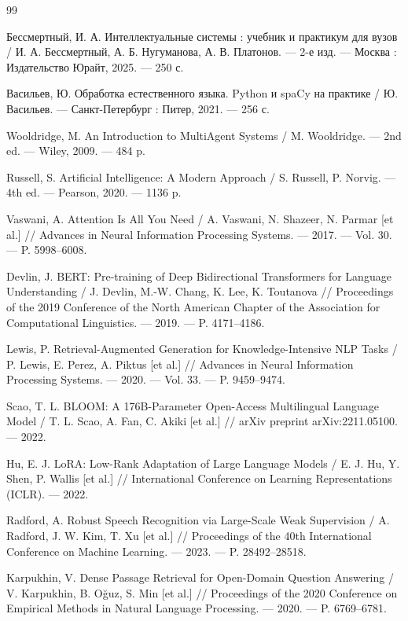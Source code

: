 \documentclass[a4paper,14pt]{extarticle}
\begin{document}
	\begin{thebibliography}{99}
		\fontsize{13pt}{15pt}\selectfont
		
		 Бессмертный, И. А. Интеллектуальные системы : учебник и практикум для вузов / И. А. Бессмертный, А. Б. Нугуманова, А. В. Платонов. — 2-е изд. — Москва : Издательство Юрайт, 2025. — 250 с.
		
		 Васильев, Ю. Обработка естественного языка. Python и spaCy на практике / Ю. Васильев. — Санкт-Петербург : Питер, 2021. — 256 с.
		
		 Wooldridge, M. An Introduction to MultiAgent Systems / M. Wooldridge. — 2nd ed. — Wiley, 2009. — 484 p.
		
		 Russell, S. Artificial Intelligence: A Modern Approach / S. Russell, P. Norvig. — 4th ed. — Pearson, 2020. — 1136 p.
		
		 Vaswani, A. Attention Is All You Need / A. Vaswani, N. Shazeer, N. Parmar [et al.] // Advances in Neural Information Processing Systems. — 2017. — Vol. 30. — P. 5998–6008.
		
		 Devlin, J. BERT: Pre-training of Deep Bidirectional Transformers for Language Understanding / J. Devlin, M.-W. Chang, K. Lee, K. Toutanova // Proceedings of the 2019 Conference of the North American Chapter of the Association for Computational Linguistics. — 2019. — P. 4171–4186.
		
		 Lewis, P. Retrieval-Augmented Generation for Knowledge-Intensive NLP Tasks / P. Lewis, E. Perez, A. Piktus [et al.] // Advances in Neural Information Processing Systems. — 2020. — Vol. 33. — P. 9459–9474.
		
		 Scao, T. L. BLOOM: A 176B-Parameter Open-Access Multilingual Language Model / T. L. Scao, A. Fan, C. Akiki [et al.] // arXiv preprint arXiv:2211.05100. — 2022.
		
		 Hu, E. J. LoRA: Low-Rank Adaptation of Large Language Models / E. J. Hu, Y. Shen, P. Wallis [et al.] // International Conference on Learning Representations (ICLR). — 2022.
		
		 Radford, A. Robust Speech Recognition via Large-Scale Weak Supervision / A. Radford, J. W. Kim, T. Xu [et al.] // Proceedings of the 40th International Conference on Machine Learning. — 2023. — P. 28492–28518.
		
		 Karpukhin, V. Dense Passage Retrieval for Open-Domain Question Answering / V. Karpukhin, B. Oğuz, S. Min [et al.] // Proceedings of the 2020 Conference on Empirical Methods in Natural Language Processing. — 2020. — P. 6769–6781.
		

\end{thebibliography}
\end{document}
